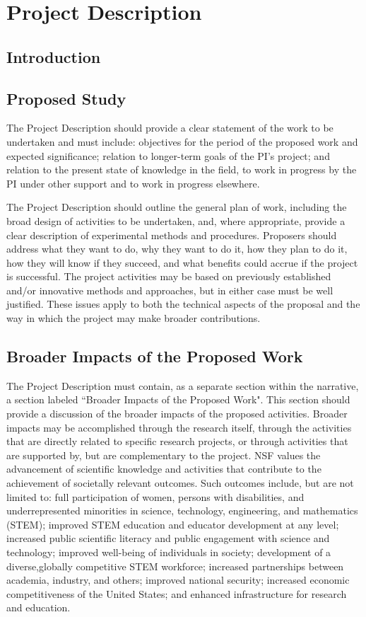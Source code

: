 \section{Project Description}
\subsection{Introduction}
\subsection{Proposed Study}
The Project Description should provide a clear statement of the work to be undertaken and must include:
objectives for the period of the proposed work and expected significance; relation to longer-term goals of the PI's
project; and relation to the present state of knowledge in the field, to work in progress by the PI under other
support and to work in progress elsewhere.

The Project Description should outline the general plan of work, including the broad design of activities to be
undertaken, and, where appropriate, provide a clear description of experimental methods and procedures.
Proposers should address what they want to do, why they want to do it, how they plan to do it, how they will
know if they succeed, and what benefits could accrue if the project is successful. The project activities may be
based on previously established and/or innovative methods and approaches, but in either case must be well
justified. These issues apply to both the technical aspects of the proposal and the way in which the project may
make broader contributions.

\subsection{Broader Impacts of the Proposed Work}
The Project Description must contain, as a separate section within the narrative, a section labeled ``Broader
Impacts of the Proposed Work". This section should provide a discussion of the broader impacts of the proposed
activities. Broader impacts may be accomplished through the research itself, through the activities that are
directly related to specific research projects, or through activities that are supported by, but are complementary to 
the project. NSF values the advancement of scientific knowledge and activities that contribute to the
achievement of societally relevant outcomes. Such outcomes include, but are not limited to: full
participation of women, persons with disabilities, and underrepresented minorities in science, technology, engineering, and
mathematics (STEM); improved STEM education and educator development at any level; increased public
scientific literacy and public engagement with science and technology; improved well-being of individuals in
society; development of a diverse,globally competitive STEM workforce; increased partnerships between
academia, industry, and others; improved national security; increased economic competitiveness of the United
States; and enhanced infrastructure for research and education.

